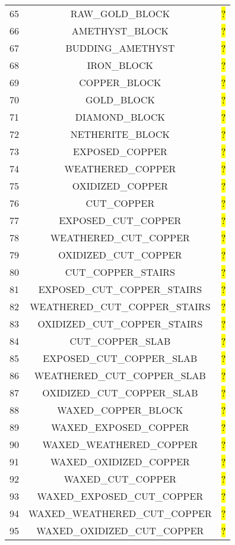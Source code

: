 \documentclass[11pt]{article}
\newcommand\myworries[1]{\sethlcolor{red}\hl{#1}}
\begin{document}
\begin{longtable}{ |c|c|c| }
	65 & RAW\_GOLD\_BLOCK & \myworries{?} \\
	66 & AMETHYST\_BLOCK & \myworries{?} \\
	67 & BUDDING\_AMETHYST & \myworries{?} \\
	68 & IRON\_BLOCK & \myworries{?} \\
	69 & COPPER\_BLOCK & \myworries{?} \\
	70 & GOLD\_BLOCK & \myworries{?} \\
	71 & DIAMOND\_BLOCK & \myworries{?} \\
	72 & NETHERITE\_BLOCK & \myworries{?} \\
	73 & EXPOSED\_COPPER & \myworries{?} \\
	74 & WEATHERED\_COPPER & \myworries{?} \\
	75 & OXIDIZED\_COPPER & \myworries{?} \\
	76 & CUT\_COPPER & \myworries{?} \\
	77 & EXPOSED\_CUT\_COPPER & \myworries{?} \\
	78 & WEATHERED\_CUT\_COPPER & \myworries{?} \\
	79 & OXIDIZED\_CUT\_COPPER & \myworries{?} \\
	80 & CUT\_COPPER\_STAIRS & \myworries{?} \\
	81 & EXPOSED\_CUT\_COPPER\_STAIRS & \myworries{?} \\
	82 & WEATHERED\_CUT\_COPPER\_STAIRS & \myworries{?} \\
	83 & OXIDIZED\_CUT\_COPPER\_STAIRS & \myworries{?} \\
	84 & CUT\_COPPER\_SLAB & \myworries{?} \\
	85 & EXPOSED\_CUT\_COPPER\_SLAB & \myworries{?} \\
	86 & WEATHERED\_CUT\_COPPER\_SLAB & \myworries{?} \\
	87 & OXIDIZED\_CUT\_COPPER\_SLAB & \myworries{?} \\
	88 & WAXED\_COPPER\_BLOCK & \myworries{?} \\
	89 & WAXED\_EXPOSED\_COPPER & \myworries{?} \\
	90 & WAXED\_WEATHERED\_COPPER & \myworries{?} \\
	91 & WAXED\_OXIDIZED\_COPPER & \myworries{?} \\
	92 & WAXED\_CUT\_COPPER & \myworries{?} \\
	93 & WAXED\_EXPOSED\_CUT\_COPPER & \myworries{?} \\
	94 & WAXED\_WEATHERED\_CUT\_COPPER & \myworries{?} \\
	95 & WAXED\_OXIDIZED\_CUT\_COPPER & \myworries{?} \\

\end{longtable}
\end{document}
